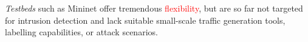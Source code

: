 \documentclass[sigconf]{acmart}
\begin{document}
 \textit{Testbeds} such as Mininet offer tremendous \textcolor{red}{flexibility}, but are so far not targeted for intrusion detection and lack suitable small-scale traffic generation tools, labelling capabilities, or attack scenarios. 



%
%
%
%
%
%
%
%
%
%
%
%
%
%
%
%
%
%
%
%
%
%
%
%
%
%
%
%
%
%
%
\end{document}
